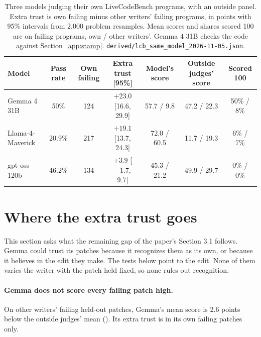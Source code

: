 \documentclass[10pt,letterpaper]{article}
\begin{document}
\begin{table}[H]
\centering
\small
\caption{Three models judging their own LiveCodeBench programs, with an outside panel. Extra trust is own failing minus
other writers' failing programs, in points with 95\% intervals from 2,000 problem resamples. Mean scores and shares
scored 100 are on failing programs, own / other writers'. Gemma 4 31B checks the code against Section~\ref{app:stamp}.
\texttt{derived/lcb\_same\_model\_2026-11-05.json}.}
\label{tab:samemodel}
\setlength{\tabcolsep}{3pt}
\begin{tabular}{@{}lcccccc@{}}
\toprule
Model & Pass rate & Own failing & Extra trust [95\%] & Model's score & Outside judges' score & Scored 100 \\
\midrule
Gemma 4 31B & 50\% & 124 & $+23.0$ [16.6, 29.9] & 57.7 / 9.8 & 47.2 / 22.3 & 50\% / 8\% \\
Llama-4-Maverick & 20.9\% & 217 & $+19.1$ [13.7, 24.3] & 72.0 / 60.5 & 11.7 / 19.3 & 6\% / 7\% \\
gpt-oss-120b & 46.2\% & 134 & $+3.9$ [$-1.7$, 9.7] & 45.3 / 21.2 & 49.9 / 29.7 & 0\% / 0\% \\
\bottomrule
\end{tabular}
\end{table}

\section{Where the extra trust goes}
\label{app:edit}

This section asks what the remaining gap of the paper's Section 3.1 follows. Gemma could trust its patches because it recognizes them as its own, or
because it believes in the edit they make. The tests below point to the edit. None of them varies the writer with the
patch held fixed, so none rules out recognition.

\paragraph{Gemma does not score every failing patch high.} On other writers' failing held-out patches, Gemma's mean score is
2.6 points below the outside judges' mean ().
Its extra trust is in its own failing patches only.
\end{document}
